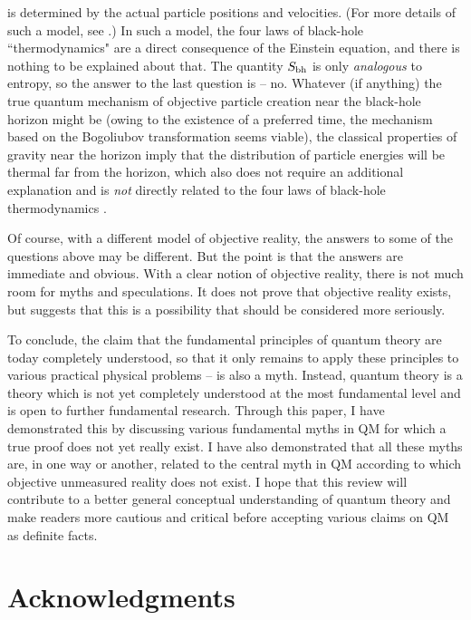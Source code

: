 \documentclass[12pt]{article}
\begin{document}
is determined by the actual particle positions and velocities. 
(For more details of such a model, see \cite{niksemicl}.)
In such a model,
the four laws of black-hole ``thermodynamics" are a direct consequence 
of the Einstein equation, and there is nothing to be explained 
about that. The quantity $S_{\rm bh}$ is only {\em analogous}
to entropy, so the answer to the last question is -- no.
Whatever (if anything) the true quantum mechanism of objective 
particle creation near the black-hole horizon might be 
(owing to the existence of a preferred time, the mechanism based 
on the Bogoliubov transformation seems viable), 
the classical properties of gravity near the horizon imply
that the distribution of particle energies will be thermal
far from the horizon, which also does not require an additional 
explanation and is {\em not} directly related to the 
four laws of black-hole thermodynamics \cite{viss}.

Of course, with a different model of objective reality, the answers
to some of the questions above may be different. But the point is 
that the answers are immediate and obvious. With 
a clear notion of objective reality, there is not much room for 
myths and speculations. It does not prove that objective reality 
exists, but suggests that this is a possibility that
should be considered more seriously. 

To conclude, the claim that the fundamental principles
of quantum theory are today completely understood, so that it only
remains to apply these principles to various practical physical problems --
is also a myth. Instead, quantum theory is a theory which is not yet
completely understood at the most fundamental level and is open
to further fundamental research. Through this paper, I have
demonstrated this by discussing various fundamental myths in QM for which
a true proof does not yet really exist. I have also demonstrated 
that all these myths are, in one way or another, related to the 
central myth in QM according to which objective unmeasured reality
does not exist. I hope that this review will contribute to a 
better general conceptual understanding of quantum theory and make readers 
more cautious and critical before accepting various claims 
on QM as definite facts.  
 



\section{Acknowledgments}
\end{document}
